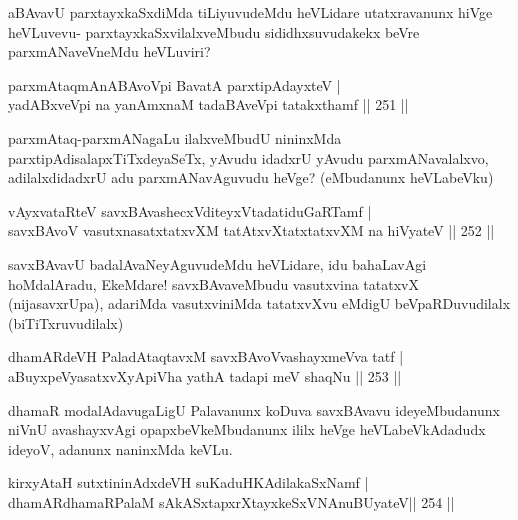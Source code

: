 \begin{artha}
aBAvavU parxtayxkaSxdiMda tiLiyuvudeMdu heVLidare utatxravanunx hiVge heVLuvevu- parxtayxkaSxvilalxveMbudu sididhxsuvudakekx beVre parxmANaveVneMdu heVLuviri?
\end{artha}

\begin{shl}
parxmAtaqmAnABAvoV\s pi BavatA parxtipAdayxteV | \\
yadABxveV\s pi na yanAmxnaM tadaBAveV\s pi tatakxthamf \hfill ||  251 ||  
\end{shl}

\begin{artha}
parxmAtaq-parxmANagaLu ilalxveMbudU nininxMda parxtipAdisalapxTiTxdeyaSeTx, yAvudu idadxrU yAvudu parxmANavalalxvo, adilalxdidadxrU adu parxmANavAguvudu heVge? (eMbudanunx heVLabeVku)
\end{artha}


\begin{shl}
vAyxvataRteV savxBAvashecxVditeyxVtadatiduGaRTamf | \\
savxBAvoV vasutxnasatxtatxvXM tatAtxvXtatxtatxvXM na hiVyateV \hfill ||  252 ||  
\end{shl}

\begin{artha}
savxBAvavU badalAvaNeyAguvudeMdu heVLidare, idu bahaLavAgi hoMdalAradu, EkeMdare! savxBAvaveMbudu vasutxvina tatatxvX (nijasavxrUpa), adariMda vasutxviniMda tatatxvXvu eMdigU beVpaRDuvudilalx (biTiTxruvudilalx)
\end{artha}


\begin{shl}
dhamARdeVH PaladAtaqtavxM savxBAvoV\s vashayxmeVva tatf | \\
aBuyxpeVyasatxvXyA\s piVha yathA tadapi meV shaqNu \hfill ||  253 ||  
\end{shl}

\begin{artha}
dhamaR modalAdavugaLigU Palavanunx koDuva savxBAvavu ideyeMbudanunx niVnU avashayxvAgi opapxbeVkeMbudanunx ililx heVge heVLabeVkAdadudx ideyoV, adanunx naninxMda keVLu.
\end{artha}

\begin{shl}
kirxyAtaH sutxtininAdxdeVH suKaduHKAdilakaSxNamf | \\
dhamARdhamaRPalaM sAkASxtapxrXtayxkeSxVNAnuBUyateV\hfill  ||  254 ||  
\end{shl}

